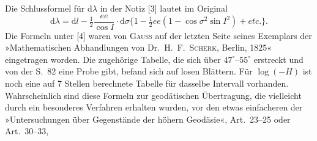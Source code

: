 {Die Schlussformel für $\mathrm d\lambda$ in der Notiz [3] lautet im Original
\[
\mathrm d\lambda=\mathrm dl-\tfrac12\frac{ee}{\cos I}\cdot\mathrm d\sigma\{1-\tfrac12ee(1-\cos\sigma^2\sin I^2)+etc.\}.
\]
Die Formeln unter [4] waren von \textsc{Gauss} auf der letzten Seite seines Exemplars der »Mathematischen Abhandlungen von Dr.\ H.\ F.\ \textsc{Scherk}, Berlin, 1825« eingetragen worden. Die zugehörige Tabelle, die sich über $47^\circ$--$55^\circ$ erstreckt und von der S.\ 82 eine Probe gibt, befand sich auf losen Blättern. Für $\log(-H)$ ist noch eine auf 7 Stellen berechnete Tabelle für dasselbe Intervall vorhanden. Wahrscheinlich sind diese Formeln zur geodätischen Übertragung, die vielleicht durch ein besonderes Verfahren erhalten wurden, vor den etwas einfacheren der »Untersuchungen über Gegenstände der höhern Geodäsie«, Art.\ 23--25 oder Art.\ 30--33,
\par}

